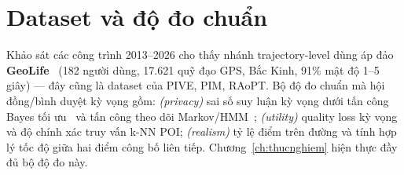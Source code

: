 \section{Dataset và độ đo chuẩn}
\label{sec:datasetmetrics}

Khảo sát các công trình 2013--2026 cho thấy nhánh trajectory-level dùng áp đảo
\textbf{GeoLife}~\cite{zheng2010geolife} (182 người dùng, 17.621 quỹ đạo GPS,
Bắc Kinh, 91\% mật độ 1--5 giây) --- đây cũng là dataset của PIVE, PIM, RAoPT.
Bộ độ đo chuẩn mà hội đồng/bình duyệt kỳ vọng gồm: \emph{(privacy)} sai số suy
luận kỳ vọng dưới tấn công Bayes tối ưu~\cite{shokri2011quantifying} và tấn công
theo dõi Markov/HMM~\cite{xiao2015protecting}; \emph{(utility)} quality loss kỳ
vọng và độ chính xác truy vấn k-NN POI; \emph{(realism)} tỷ lệ điểm trên đường và
tính hợp lý tốc độ giữa hai điểm công bố liên tiếp. Chương~\ref{ch:thucnghiem}
hiện thực đầy đủ bộ độ đo này.
